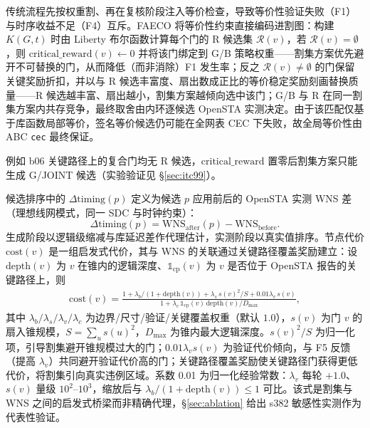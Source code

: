\documentclass[journal]{IEEEtran}
\begin{document}
传统流程先按权重割、再在复核阶段注入等价检查，导致等价性验证失败（F1）与时序收益不足（F4）互斥。FAECO 将等价性约束直接编码进割图：构建 $K(G, t)$ 时由 Liberty 布尔函数计算每个门的 R 候选集 $\mathcal{R}(v)$，若 $\mathcal{R}(v)=\emptyset$，则 $\mathrm{critical\_reward}(v)\leftarrow 0$ 并将该门绑定到 G/B 策略权重——割集方案优先避开不可替换的门，从而降低（而非消除）F1 发生率；反之 $\mathcal{R}(v)\neq\emptyset$ 的门保留关键奖励折扣，并以与 R 候选丰富度、扇出数成正比的等价稳定奖励刻画替换质量——R 候选越丰富、扇出越小，割集方案越倾向选中该门；G/B 与 R 在同一割集方案内共存竞争，最终取舍由内环逐候选 OpenSTA 实测决定。由于该匹配仅基于库函数局部等价，签名等价候选仍可能在全网表 CEC 下失败，故全局等价性由 ABC \texttt{cec} 最终保证。

例如 b06 关键路径上的复合门均无 R 候选，$\mathrm{critical\_reward}$ 置零后割集方案只能生成 G/JOINT 候选（实验验证见 \S\ref{sec:itc99}）。

候选排序中的 $\Delta\mathrm{timing}(p)$ 定义为候选 $p$ 应用前后的 OpenSTA 实测 WNS 差（理想线网模式，同一 SDC 与时钟约束）：
\begin{equation}\label{eq:dtiming}
\Delta\mathrm{timing}(p) = \mathrm{WNS}_{\mathrm{after}}(p) - \mathrm{WNS}_{\mathrm{before}}.
\end{equation}
生成阶段以逻辑级缩减与库延迟差作代理估计，实测阶段以真实值排序。节点代价 $\mathrm{cost}(v)$ 是一组启发式代价，其与 WNS 的关联通过关键路径覆盖奖励建立：设 $\mathrm{depth}(v)$ 为 $v$ 在锥内的逻辑深度、$\mathbb{1}_{\mathrm{cp}}(v)$ 为 $v$ 是否位于 OpenSTA 报告的关键路径上，则
{\small
\begin{equation}
\label{eq:cost}
\begin{split}
\mathrm{cost}(v) = \frac{1 + \lambda_b/(1+\mathrm{depth}(v)) + \lambda_s\,s(v)^2/S + 0.01\lambda_v\,s(v)}{1 + \lambda_c\,\mathbb{1}_{\mathrm{cp}}(v)\,\mathrm{depth}(v)/D_{\max}},
\end{split}
\end{equation}
}
其中 $\lambda_b/\lambda_s/\lambda_v/\lambda_c$ 为边界/尺寸/验证/关键覆盖权重（默认 $1.0$），$s(v)$ 为门 $v$ 的扇入锥规模，$S=\sum_u s(u)^2$，$D_{\max}$ 为锥内最大逻辑深度。$s(v)^2/S$ 为归一化项，引导割集避开锥规模过大的门；$0.01\lambda_v s(v)$ 为验证代价倾向，与 F5 反馈（提高 $\lambda_v$）共同避开验证代价高的门；关键路径覆盖奖励使关键路径门获得更低代价，将割集引向真实违例区域。系数 0.01 为归一化经验常数：$\lambda_v$ 每轮 $+1.0$、$s(v)$ 量级 $10^2$--$10^3$，缩放后与 $\lambda_b/(1+\mathrm{depth}(v))\le 1$ 可比。该式是割集与 WNS 之间的启发式桥梁而非精确代理，\S\ref{sec:ablation} 给出 s382 敏感性实测作为代表性验证。
\end{document}
